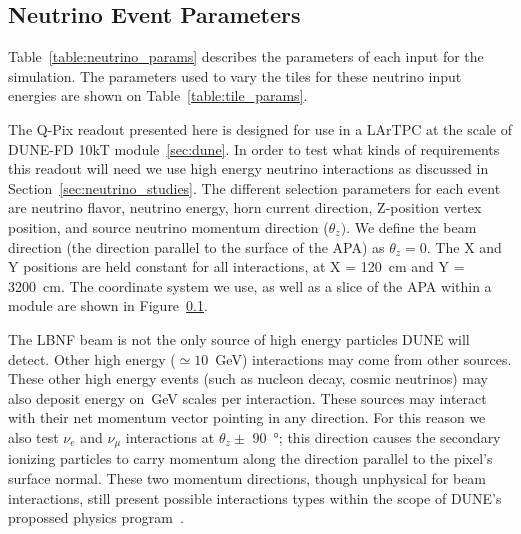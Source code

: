 \subsection{Neutrino Event Parameters}

Table~\ref{table:neutrino_params} describes the parameters of each input for the simulation.
The parameters used to vary the tiles for these neutrino input energies are shown on Table~\ref{table:tile_params}.

The Q-Pix readout presented here is designed for use in a LArTPC at the scale of DUNE-FD 10kT module~\ref{sec:dune}.
In order to test what kinds of requirements this readout will need we use high energy neutrino interactions as discussed in Section~\ref{sec:neutrino_studies}.
The different selection parameters for each event are neutrino flavor, neutrino energy, horn current direction, Z-position vertex position, and source neutrino momentum direction ($\theta_{z})$.
We define the beam direction (the direction parallel to the surface of the APA) as $\theta_{z} = 0$.
The X and Y positions are held constant for all interactions, at X = 120~\unit{cm} and Y = 3200~\unit{cm}.
The coordinate system we use, as well as a slice of the APA within a module are shown in Figure~\ref{}.

The LBNF beam is not the only source of high energy particles DUNE will detect.
Other high energy ($\simeq 10$~\unit{GeV}) interactions may come from other sources.
These other high energy events (such as nucleon decay, cosmic neutrinos) may also deposit energy on~\unit{GeV} scales per interaction.
These sources may interact with their net momentum vector pointing in any direction.
For this reason we also test $\nu_{e}$ and $\nu_{\mu}$ interactions at $\theta_{z} \pm$ 90~\unit{\degree}; this direction causes the secondary ionizing particles to carry momentum along the direction parallel to the pixel's surface normal.
These two momentum directions, though unphysical for beam interactions, still present possible interactions types within the scope of DUNE's propossed physics program~\citep{DUNE_TDRv3_Abi_2020}.

